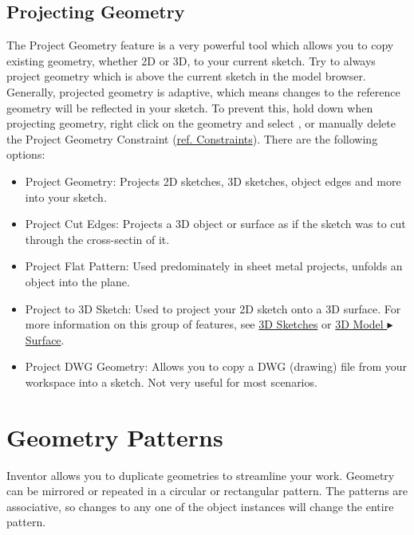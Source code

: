 \cbend

\subsection{Projecting Geometry}

\cbstart
{}

The Project Geometry feature is a very powerful tool which allows you to copy existing geometry, whether 2D or 3D, to your current sketch. Try to always project geometry which is above the current sketch in the model browser. Generally, projected geometry is adaptive, which means changes to the reference geometry will be reflected in your sketch. To prevent this, hold down  when projecting geometry, right click on the geometry and select , or manually delete the Project Geometry Constraint (\hyperref[chap:constraints]{ref. Constraints}). There are the following options:

\begin{itemize}
\item Project Geometry: Projects 2D sketches, 3D sketches, object edges and more into your sketch.
\item Project Cut Edges: Projects a 3D object or surface as if the sketch was to cut through the cross-sectin of it.
\item Project Flat Pattern: Used predominately in sheet metal projects, unfolds an object into the plane.
\item Project to 3D Sketch: Used to project your 2D sketch onto a 3D surface. For more information on this group of features, see \hyperref[section: 3D Sketches]{3D Sketches} or \hyperref[subsection: 3D Model Surface]{3D Model $\blacktriangleright$ Surface}.
\item Project DWG Geometry:  Allows you to copy a DWG (drawing) file from your workspace into a sketch. Not very useful for most scenarios.
\end{itemize}

\cbend

\section{Geometry Patterns}

\cbstart
{}

Inventor allows you to duplicate geometries to streamline your work. Geometry can be \newline mirrored or repeated in a circular or rectangular pattern. The patterns are associative, so changes to any one of the object instances will change the entire pattern.

